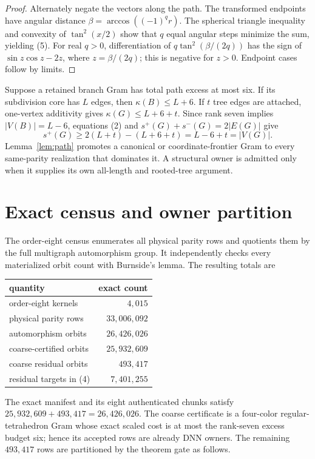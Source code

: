 \documentclass[11pt]{article}
\theoremstyle{remark}
\newcommand{\splus}{s^+}
\newcommand{\sminus}{s^-}
\newcommand{\kappad}{\kappa}
\begin{document}
\begin{proof}
Alternately negate the vectors along the path.  The transformed endpoints
have angular distance $\beta=\arccos((-1)^q r)$.  The spherical triangle
inequality and convexity of $\tan^2(x/2)$ show that $q$ equal angular steps
minimize the sum, yielding (5).  For real $q>0$, differentiation of
$q\tan^2(\beta/(2q))$ has the sign of
$\sin z\cos z-2z$, where $z=\beta/(2q)$; this is negative for $z>0$.
Endpoint cases follow by limits.
\end{proof}

Suppose a retained branch Gram has total path excess at most six.  If its
subdivision core has $L$ edges, then $\kappad(B)\leq L+6$.  If $t$ tree edges
are attached, one-vertex additivity gives
$\kappad(G)\leq L+6+t$.  Since rank seven implies $|V(B)|=L-6$, equations
(2) and $\splus(G)+\sminus(G)=2|E(G)|$ give
\begin{equation}
 \splus(G)\geq2(L+t)-(L+6+t)=L-6+t=|V(G)|.                  \tag{6}
\end{equation}
Lemma~\ref{lem:path} promotes a canonical or coordinate-frontier Gram to every
same-parity realization that dominates it.  A structural owner is admitted
only when it supplies its own all-length and rooted-tree argument.

\section{Exact census and owner partition}

The order-eight census enumerates all physical parity rows and quotients them
by the full multigraph automorphism group.  It independently checks every
materialized orbit count with Burnside's lemma.  The resulting totals are
\begin{center}
\begin{tabular}{lr}
\toprule
quantity & exact count\\
\midrule
order-eight kernels & $4{,}015$\\
physical parity rows & $33{,}006{,}092$\\
automorphism orbits & $26{,}426{,}026$\\
coarse-certified orbits & $25{,}932{,}609$\\
coarse residual orbits & $493{,}417$\\
residual targets in (4) & $7{,}401{,}255$\\
\bottomrule
\end{tabular}
\end{center}
The exact manifest and its eight authenticated chunks satisfy
$25{,}932{,}609+493{,}417=26{,}426{,}026$.  The coarse certificate is a
four-color regular-tetrahedron Gram whose exact scaled cost is at most the
rank-seven excess budget six; hence its accepted rows are already DNN owners.
The remaining $493{,}417$ rows are partitioned by the theorem gate as follows.
\end{document}
